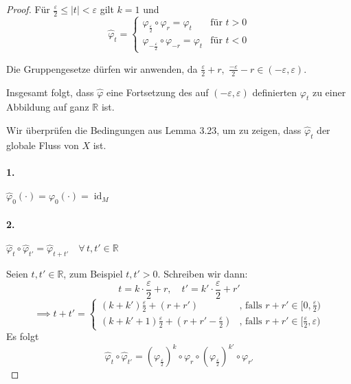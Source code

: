 \documentclass[fleqn, 12pt, letterpaper]{article}
\begin{document}
\begin{proof}
Für $\frac{\varepsilon}{2} \leq \lvert t \rvert < \varepsilon$ gilt $k = 1$ und 
\[
\hat{\varphi}_t = 
\begin{cases} 
  \varphi_{\frac{\varepsilon}{2}} \circ \varphi_r = \varphi_t
  & \text{für } t > 0 \\[1em]
  \varphi_{-\frac{\varepsilon}{2}} \circ \varphi_{-r} = \varphi_t
  & \text{für } t < 0 
\end{cases}
\]

\vspace{1em}

Die Gruppengesetze dürfen wir anwenden, da 
\(
\frac{\varepsilon}{2} + r,\; \frac{-\varepsilon}{2} - r \in (-\varepsilon, \varepsilon).
\)

\vspace{1em}

Insgesamt folgt, dass $\hat{\varphi}$ eine Fortsetzung des auf $(-\varepsilon, \varepsilon)$ definierten $\varphi_t$ zu einer Abbildung auf ganz $\mathbb{R}$ ist.

Wir überprüfen die Bedingungen aus Lemma 3.23, um zu zeigen, dass $\hat{\varphi}_t$ der globale Fluss von $X$ ist.
\paragraph{1.} $\hat{\varphi}_0(\cdot) = \varphi_0(\cdot) = \operatorname{id}_M$ \hspace{1em} \textcolor{green}{\checkmark}

\paragraph{2.} $\hat{\varphi}_t \circ \hat{\varphi}_{t'} = \hat{\varphi}_{t + t'} \quad \forall \, t, t' \in \mathbb{R}$

Seien $t, t' \in \mathbb{R}$, zum Beispiel $t, t' > 0$. Schreiben wir dann:
\[
t = k \cdot \frac{\varepsilon}{2} + r, \quad t' = k' \cdot \frac{\varepsilon}{2} + r'
\]
\[
\implies t + t' = 
\begin{cases} 
    (k + k') \frac{\varepsilon}{2} + (r + r') & \text{, falls } r + r' \in [0, \frac{\varepsilon}{2}) \\[1em]
    (k + k' + 1) \frac{\varepsilon}{2} + (r + r' - \frac{\varepsilon}{2}) & \text{, falls } r + r' \in [\frac{\varepsilon}{2}, \varepsilon)
\end{cases}
\]
Es folgt
\[
\hat{\varphi}_t \circ \hat{\varphi}_{t'} = \left(\varphi_{\frac{\varepsilon}{2}}\right)^k \circ \varphi_r \circ \left(\varphi_{\frac{\varepsilon}{2}}\right)^{k'} \circ \varphi_{r'}
\] 


\end{proof}
\end{document}
